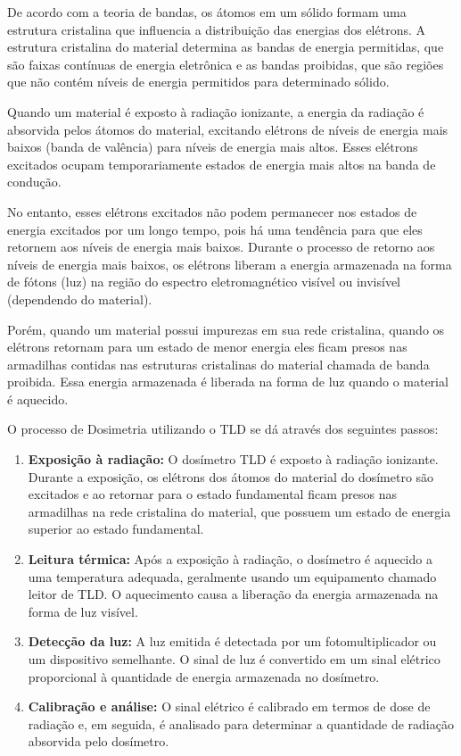 \documentclass[11pt,a4paper]{article}
\begin{document}
		De acordo com a teoria de bandas, os átomos em um sólido formam uma estrutura cristalina que influencia a distribuição das energias dos elétrons. A estrutura cristalina do material determina as bandas de energia permitidas, que são faixas contínuas de energia eletrônica e as bandas proibidas, que são regiões que não contém níveis de energia permitidos para determinado sólido.
		
		Quando um material é exposto à radiação ionizante, a energia da radiação é absorvida pelos átomos do material, excitando elétrons de níveis de energia mais baixos (banda de valência) para níveis de energia mais altos. Esses elétrons excitados ocupam temporariamente estados de energia mais altos na banda de condução.
		
		No entanto, esses elétrons excitados não podem permanecer nos estados de energia excitados por um longo tempo, pois há uma tendência para que eles retornem aos níveis de energia mais baixos. Durante o processo de retorno aos níveis de energia mais baixos, os elétrons liberam a energia armazenada na forma de fótons (luz) na região do espectro eletromagnético visível ou invisível (dependendo do material).
		
		Porém, quando um material possui impurezas em sua rede cristalina, quando os elétrons retornam para um estado de menor energia eles ficam presos nas armadilhas contidas nas estruturas cristalinas do material chamada de banda proibida. Essa energia armazenada é liberada na forma de luz quando o material é aquecido.
	
		O processo de Dosimetria utilizando o TLD se dá através dos seguintes passos:

		\begin{enumerate}
			\item \textbf{Exposição à radiação:} O dosímetro TLD é exposto à radiação ionizante. Durante a exposição, os elétrons dos átomos do material do dosímetro são excitados e ao retornar para o estado fundamental ficam presos nas armadilhas na rede cristalina do material, que possuem um estado de energia superior ao estado fundamental.
			\item \textbf{Leitura térmica:} Após a exposição à radiação, o dosímetro é aquecido a uma temperatura adequada, geralmente usando um equipamento chamado leitor de TLD. O aquecimento causa a liberação da energia armazenada na forma de luz visível.
			\item \textbf{Detecção da luz:} A luz emitida é detectada por um fotomultiplicador ou um dispositivo semelhante. O sinal de luz é convertido em um sinal elétrico proporcional à quantidade de energia armazenada no dosímetro.
			\item \textbf{Calibração e análise:} O sinal elétrico é calibrado em termos de dose de radiação e, em seguida, é analisado para determinar a quantidade de radiação absorvida pelo dosímetro.
		\end{enumerate}
		
\end{document}
